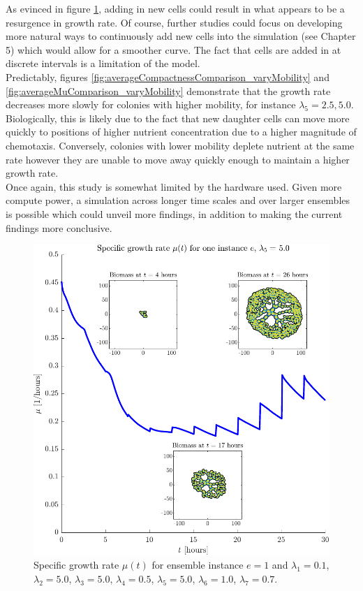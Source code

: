 As evinced in figure \ref{fig:MuSingleInstance5.0}, adding in new cells 
could result in what appears to be a resurgence in growth rate. Of course,
further studies could focus on developing more natural ways to continuously add new cells into the 
simulation (see Chapter 5) which would allow for a smoother curve.
The fact that cells are added in at discrete intervals is a limitation of the model.
\\

Predictably, figures \ref{fig:averageCompactnessComparison_varyMobility} 
and \ref{fig:averageMuComparison_varyMobility} demonstrate 
that the growth rate decreases more slowly for colonies with higher 
mobility, for instance $\lambda_5 = 2.5, 5.0$. Biologically,
this is likely due to the fact that new daughter cells can move more
quickly to positions of higher nutrient concentration due to a 
higher magnitude of chemotaxis. Conversely, colonies with lower mobility
deplete nutrient at the same rate however they are 
unable to move away quickly enough to maintain a higher growth rate.
\\

Once again, this study is somewhat limited by the hardware used. 
Given more compute power, a simulation across longer time scales and 
over larger ensembles is 
possible which could unveil more findings, in addition to 
making the current findings more conclusive.


\begin{figure}[!htb]
    \centering
    \includegraphics[width= \textwidth]{
        chapter4/figures/Inset_L1_0o10_L2_5o00_L3_5o00_L4_0o50_L5_5o00_L6_1o00_L7_0o70.pdf}
    \caption{Specific growth rate $\mu(t)$ for ensemble instance $e = 1$ and 
             $\lambda_1 = 0.1$,  
             $\lambda_2 = 5.0$, 
             $\lambda_3 = 5.0$, 
             $\lambda_4 = 0.5$, 
             $\lambda_5 = 5.0$, 
             $\lambda_6 = 1.0$, 
             $\lambda_7 = 0.7$.}
    \label{fig:MuSingleInstance5.0}
\end{figure}

